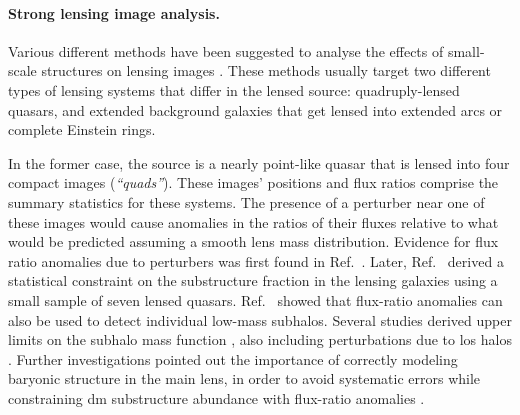 \paragraph*{Strong lensing image analysis.} Various different methods have been suggested to analyse the effects of small-scale structures on lensing images \cite{Drlica-Wagner:2019aa}. These methods usually target two different types of lensing systems that differ in the lensed source: quadruply-lensed quasars, and extended background galaxies that get lensed into extended arcs or complete Einstein rings.

In the former case, the source is a nearly point-like quasar that is lensed into four compact images  (\emph{``quads''}). These images' positions and flux ratios comprise the summary statistics for these systems. The presence of a perturber near one of these images would cause anomalies in the ratios of their fluxes relative to what would be predicted assuming a smooth lens mass distribution. Evidence for flux ratio anomalies due to perturbers was first found in Ref.~\cite{Mao:1997ek}. Later, Ref.~\cite{Dalal:2001fq} derived a statistical constraint on the substructure fraction in the lensing galaxies using a small sample of seven lensed quasars. Ref.~\cite{Nierenberg:2014cga} showed that flux-ratio anomalies can also be used to detect individual low-mass subhalos. Several studies derived upper limits on the subhalo mass function %
\cite{Nierenberg:2017vlg}, also including perturbations due to \gls*{los} halos \cite{Gilman:2017voy, Gilman:2019nap}. Further investigations pointed out the importance of correctly modeling baryonic structure in the main lens, in order to avoid systematic errors while constraining \gls*{dm} substructure abundance with flux-ratio anomalies \cite{Hsueh:2016aih, Hsueh:2017zfs, Hsueh:2019ynk}. 

